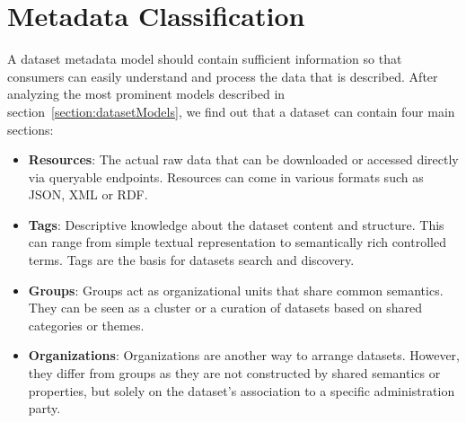 
\section{Metadata Classification}
\label{section:harmonized_metadata}
A dataset metadata model should contain sufficient information so that consumers can easily understand and process the data that is described. After analyzing the most prominent models described in section~\ref{section:datasetModels}, we find out that a dataset can contain four main sections:
\begin{itemize}
  \item \textbf{Resources}: The actual raw data that can be downloaded or accessed directly via queryable endpoints. Resources can come in various formats such as JSON, XML or RDF.
  \item \textbf{Tags}: Descriptive knowledge about the dataset content and structure. This can range from simple textual representation to semantically rich controlled terms. Tags are the basis for datasets search and discovery.
  \item \textbf{Groups}: Groups act as organizational units that share common semantics. They can be seen as a cluster or a curation of datasets based on shared categories or themes.
  \item \textbf{Organizations}: Organizations are another way to arrange datasets. However, they differ from groups as they are not constructed by shared semantics or properties, but solely on the dataset's association to a specific administration party.
\end{itemize}

